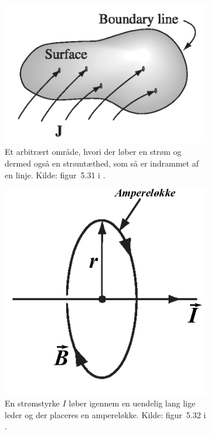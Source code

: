 \begin{figure}
    \begin{subfigure}{.47\columnwidth}
        \centering
        \includegraphics[width=\columnwidth]{Elektro/Figurer/ampere.PNG}
        \caption{Et arbitrært område, hvori der løber en strøm og dermed også en strømtæthed, som så er indrammet af en linje. Kilde: figur~5.31 i \cite{griffithsIntroductionElectrodynamics2017}.}
        \label{fig:ampere}
    \end{subfigure}
%
\hfill
%
    \begin{subfigure}{.47\columnwidth}
        \centering
        \includegraphics[width=.7\columnwidth]{Elektro/Figurer/lang_lige_leder.PNG}
        \caption{En strømstyrke $I$ løber igennem en uendelig lang lige leder og der placeres en ampereløkke. Kilde: figur~5.32 i \cite{griffithsIntroductionElectrodynamics2017}.}
        \label{fig:lang_lige_leder}
    \end{subfigure}
    \caption{ }
\end{figure}
%

